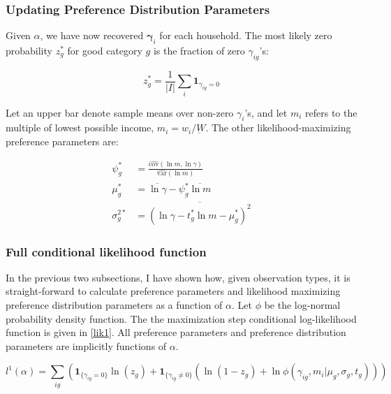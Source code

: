 \subsubsection{Updating Preference Distribution Parameters}

Given $\alpha$, we have now recovered $\mathbf{\gamma}_i$ for each household.  The most likely zero probability $z_g^*$ for good category $g$ is the fraction of zero $\gamma_{ig}$'s:

\begin{equation}
    z_g^* = \frac{1}{|I|} \sum_{i} \mathbf{1}_{\gamma_{ig} = 0} \nonumber
\end{equation}

Let an upper bar denote sample means over non-zero $\gamma_i$'s, and let $m_i$ refers to the multiple of lowest possible income, $m_i = w_i/\underbar{W}$.  The other likelihood-maximizing preference parameters are:

\begin{align}
    \psi_g^* &= \frac{\hat{\mbox{cov}}(\ln m, \ln \gamma)}{\hat{\mbox{var}}(\ln m)} \nonumber \\
    \mu_g^* &= \overline{\ln \gamma} - \psi_g^* \overline{\ln m} \nonumber \\
    \sigma_g^{2*} &= \overline{\left(\ln \gamma - t_g^* \ln m - \mu_g^*\right)^2}
\end{align}

\subsubsection{Full conditional likelihood function}

In the previous two subsections, I have shown how, given observation types, it is straight-forward to calculate preference parameters and likelihood maximizing preference distribution parameters as a function of $\alpha$.  Let $\phi$ be the log-normal probability density function.   The the maximization step conditional log-likelihood function is given in \eqref{lik1}.  All preference parameters and preference distribution parameters are implicitly functions of $\alpha$.

\begin{equation}
	\label{lik1}
    l^1(\alpha) = \sum_{ig} \left(\mathbf{1}_{\{\gamma_{ig} = 0\}}\ln\left(z_g\right) + \mathbf{1}_{\{\gamma_{ig} \neq 0\}} \left(\ln\left(1 - z_g\right)+\ln \phi(\gamma_{ig},m_i|\mu_g,\sigma_g,t_g)\right)\right)
\end{equation}

